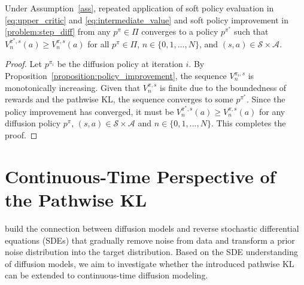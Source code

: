 \begin{proposition}\label{proposition:policy_iteration}
Under Assumption~\ref{ass}, repeated application of soft policy evaluation in \eqref{eq:upper_critic} and \eqref{eq:intermediate_value} and soft policy improvement in \eqref{problem:step_diff} from any $p^\pi\in\Pi$ converges to a policy $p^{\pi^*}$ such that $V_n^{\pi^*,s}(a)\geq V_n^{\pi,s}(a)$ for all $p^\pi\in\Pi$, $n\in\{0,1,\ldots,N\}$, and $(s,a)\in\mathcal{S}\times\mathcal{A}$.
\end{proposition}
\begin{proof}

Let $p^{\pi_i}$ be the diffusion policy at iteration $i$. By Proposition~\ref{proposition:policy_improvement}, the sequence $V_n^{\pi_i, s}$ is monotonically increasing. Given that $V^{\pi,s}_n$ is finite due to the boundedness of rewards and the pathwise KL, the sequence converges to some $p^{\pi^*}$. Since the policy improvement has converged, it must be $V^{\pi^*,s}_n(a)\geq V^{\pi, s}_n(a)$ for any diffusion policy $p^\pi$, $(s, a)\in\mathcal{S}\times\mathcal{A}$ and $n\in\{0, 1, \ldots, N\}$. This completes the proof. 
\end{proof}
    



\section{Continuous-Time Perspective of the Pathwise KL}\label{appsec:continuous_time}
\citet{diffusion_sde} build the connection between diffusion models and reverse stochastic differential equations (SDEs) that gradually remove noise from data and transform a prior noise distribution into the target distribution. Based on the SDE understanding of diffusion models, we aim to investigate whether the introduced pathwise KL can be extended to continuous-time diffusion modeling.  

